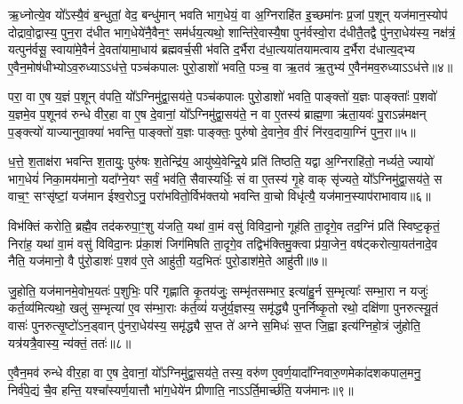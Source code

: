 ऋ॒ध्नोत्ये॒व यो᳚\-ऽस्यै॒वं ब॒न्धुतां॒ वेद॒ बन्धु॑मान् भवति भाग॒धेयं॒ वा अ॒ग्निराहि॑त इ॒च्छमा॑नः प्र॒जां प॒शून् यज॑मान॒स्योप॑ दोद्रावो॒द्वास्य॒ पुन॒रा द॑धीत भाग॒धेये॑नै॒वैन॒ꣳ॒ सम॑र्धय॒त्यथो॒ शान्ति॑रे॒वास्यै॒षा पुन॑र्वस्वो॒रा द॑धीतै॒तद्वै पु॑नरा॒धेय॑स्य॒ नक्ष॑त्रं॒ यत्पुन॑र्वसू॒ स्वाया॑मे॒वैनं॑ दे॒वता॑यामा॒धाय॑ ब्रह्मवर्च॒सी भ॑वति द॒र्भैरा द॑धा॒त्यया॑तयामत्वाय द॒र्भैरा द॑धात्य॒द्भ्य ए॒वैन॒मोष॑धीभ्यो\-ऽव॒रुध्या\-ऽ\-ऽध॑त्ते॒ पञ्च॑कपालः पुरो॒डाशो॑ भवति॒ पञ्च॒ वा ऋ॒तव॑ ऋ॒तुभ्य॑ ए॒वैन॑मव॒रुध्या\-ऽ\-ऽध॑त्ते॥४॥

{\anuvakamend[{अशी॑यत॒ तत् तेन॒ वेद॑ द॒र्भैः पञ्च॑विꣳशतिश्च॥१॥}]}

परा॒ वा ए॒ष य॒ज्ञं प॒शून् व॑पति॒ यो᳚\-ऽग्निमु॑द्वा॒सय॑ते॒ पञ्च॑कपालः पुरो॒डाशो॑ भवति॒ पाङ्क्तो॑ य॒ज्ञः पाङ्क्ताः᳚ प॒शवो॑ य॒ज्ञमे॒व प॒शूनव॑ रुन्धे वीर॒हा वा ए॒ष दे॒वानां॒ यो᳚\-ऽग्निमु॑द्वा॒सय॑ते॒ न वा ए॒तस्य॑ ब्राह्म॒णा ऋ॑ता॒यवः॑ पु॒रा\-ऽन्न॑मक्षन् प॒ङ्क्त्यो॑ याज्यानुवा॒क्या॑ भवन्ति॒ पाङ्क्तो॑ य॒ज्ञः पाङ्क्तः॒ पुरु॑षो दे॒वाने॒व वी॒रं नि॑रव॒दाया॒ग्निं पुन॒रा॥५॥

ध॒त्ते॒ श॒ताक्ष॑रा भवन्ति श॒तायुः॒ पुरु॑षः श॒तेन्द्रि॑य॒ आयु॑ष्ये॒वेन्द्रि॒ये प्रति॑ तिष्ठति॒ यद्वा अ॒ग्निराहि॑तो॒ नर्ध्यते॒ ज्यायो॑ भाग॒धेयं॑ निका॒मय॑मानो॒ यदा᳚ग्ने॒यꣳ सर्वं॒ भव॑ति॒ सैवास्यर्धिः॒ सं वा ए॒तस्य॑ गृ॒हे वाक् सृ॑ज्यते॒ यो᳚\-ऽग्निमु॑द्वा॒सय॑ते॒ स वाच॒ꣳ॒ सꣳसृ॑ष्टां॒ यज॑मान ईश्व॒रो\-ऽनु॒ परा॑भवितो॒र्विभ॑क्तयो भवन्ति वा॒चो विधृ॑त्यै॒ यज॑मान॒स्याप॑राभावाय॥६॥

विभ॑क्तिं करोति॒ ब्रह्मै॒व तद॑करुपा॒ꣳ॒शु य॑जति॒ यथा॑ वा॒मं वसु॑ विविदा॒नो गूह॑ति ता॒दृगे॒व तद॒ग्निं प्रति॑ स्विष्ट॒कृतं॒ निरा॑ह॒ यथा॑ वा॒मं वसु॑ विविदा॒नः प्र॑का॒शं जिग॑मिषति ता॒दृगे॒व तद्विभ॑क्तिमु॒क्त्वा प्र॑या॒जेन॒ वष॑ट्करोत्या॒यत॑नादे॒व नैति॒ यज॑मानो॒ वै पु॑रो॒डाशः॑ प॒शव॑ ए॒ते आहु॑ती॒ यद॒भितः॑ पुरो॒डाश॑मे॒ते आहु॑ती॥७॥

जु॒होति॒ यज॑मानमे॒वोभ॒यतः॑ प॒शुभिः॒ परि॑ गृह्णाति कृ॒तय॑जुः॒ सम्भृ॑तसम्भार॒ इत्या॑हु॒र्न स॒म्भृत्याः᳚ सम्भा॒रा न यजुः॑ कर्त॒व्य॑मित्यथो॒ खलु॑ स॒म्भृत्या॑ ए॒व स॑म्भा॒राः क॑र्त॒व्यं॑ यजु॑र्य॒ज्ञस्य॒ समृ॑द्ध्यै पुनर्निष्कृ॒तो रथो॒ दक्षि॑णा पुनरुत्स्यू॒तं वासः॑ पुनरुत्सृ॒ष्टो॑\-ऽन॒ड्वान् पु॑नरा॒धेय॑स्य॒ समृ॑द्ध्यै स॒प्त ते॑ अग्ने स॒मिधः॑ स॒प्त जि॒ह्वा इत्य॑ग्निहो॒त्रं जु॑होति॒ यत्र॑यत्रै॒वास्य॒ न्य॑क्तं॒ ततः॑॥८॥

ए॒वैन॒मव॑ रुन्धे वीर॒हा वा ए॒ष दे॒वानां॒ यो᳚\-ऽग्निमु॑द्वा॒सय॑ते॒ तस्य॒ वरु॑ण ए॒वर्ण॒यादा᳚ग्निवारु॒णमेका॑दशकपाल॒मनु॒ निर्व॑पे॒द्यं चै॒व हन्ति॒ यश्चा᳚स्यर्ण॒यात्तौ भा॑ग॒धेये॑न प्रीणाति॒ ना\-ऽ\-ऽर्ति॒मार्च्छ॑ति॒ यज॑मानः॥९॥

